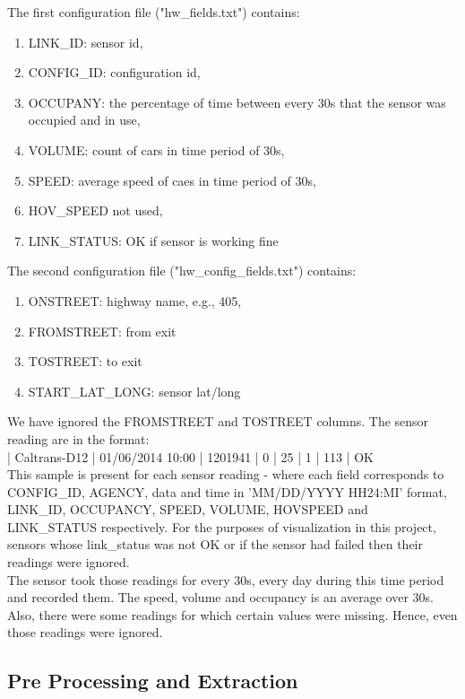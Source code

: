 \documentclass{llncs}
\begin{document}
The first configuration file ("hw\_fields.txt") contains: 

\begin{enumerate}
\item LINK\_ID: sensor id,
\item CONFIG\_ID: configuration id, 
\item OCCUPANY: the percentage of time between every 30s that the sensor was occupied and in use,
\item VOLUME: count of cars in time period of 30s,
\item SPEED: average speed of caes in time period of 30s, 
\item HOV\_SPEED not used,
\item LINK\_STATUS: OK if sensor is working fine
\end{enumerate}

The second configuration file ("hw\_config\_fields.txt") contains:

\begin{enumerate}
\item ONSTREET: highway name, e.g., 405, 
\item FROMSTREET: from exit
\item TOSTREET: to exit
\item START\_LAT\_LONG: sensor lat/long
\end{enumerate}

We have ignored the FROMSTREET and TOSTREET columns.
\newline
The sensor reading are in the format: 
\newline
\\ \indent {} | Caltrans-D12 | 01/06/2014 10:00 | 1201941 | 0 | 25 | 1 | 113 | OK
\\This sample is present for each sensor reading - where each field corresponds to CONFIG\_ID, AGENCY, data and time in 'MM/DD/YYYY HH24:MI' format, LINK\_ID, OCCUPANCY, SPEED, VOLUME, HOVSPEED and LINK\_STATUS respectively. For the purposes of visualization in this project, sensors whose link\_status was not OK or if the sensor had failed then their readings were ignored. 
\\ The sensor took those readings for every 30s, every day during this time period and recorded them. The speed, volume and occupancy is an average over 30s. Also, there were some readings for which certain values were missing. Hence, even those readings were ignored. 

\subsection{Pre Processing and Extraction}\label{sec:Pre Processing and Extraction}
\end{document}
